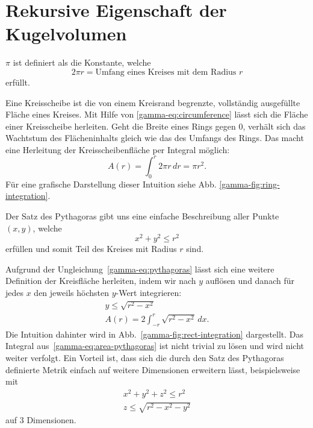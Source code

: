 \section{Rekursive Eigenschaft der Kugelvolumen\label{gamma:section:spheres}}

$\pi$ ist definiert als die Konstante, welche
%
\begin{equation}
\label{gamma-eq:circumference}
    2 \pi r = \text{Umfang eines Kreises mit dem Radius $r$}
\end{equation}
erfüllt.

Eine Kreisscheibe ist die von einem Kreisrand begrenzte, vollständig ausgefüllte Fläche eines Kreises.
%
Mit Hilfe von \eqref{gamma-eq:circumference} lässt sich die Fläche einer Kreisscheibe herleiten. 
Geht die Breite eines Rings gegen 0, verhält sich das 
Wachtstum des Flächeninhalts gleich wie das des Umfangs des Rings.
Das macht eine Herleitung der Kreisscheibenfläche per Integral möglich:
\begin{equation}
\label{gamma-eq:area}
    A(r) = \int_{0}^{r} 2 \pi r \,dr = \pi r^2
.
\end{equation}
Für eine grafische Darstellung dieser
Intuition siehe Abb. \ref{gamma-fig:ring-integration}.

Der Satz des Pythagoras gibt uns eine einfache Beschreibung aller
%
Punkte $(x, y)$, welche
\begin{equation}
\label{gamma-eq:pythagoras}
    x^2 + y^2 \leq r^2
\end{equation}
erfüllen und somit Teil des Kreises mit Radius $r$ sind.

Aufgrund der Ungleichung~\eqref{gamma-eq:pythagoras}
lässt sich eine weitere Definition der Kreisfläche herleiten, 
indem wir nach $y$ auflösen und danach für jedes $x$ den jeweils höchsten $y$-Wert integrieren:
\begin{gather}
\label{gamma-eq:pythagoras-y}
    y \leq \!\sqrt{r^2 - x^2} \\
\label{gamma-eq:area-pythagoras}
    A(r) = 2 \int_{-r}^{r} \!\sqrt{r^2-x^2} \,dx.
\end{gather}
Die Intuition dahinter wird in Abb.~\ref{gamma-fig:rect-integration} dargestellt.
Das Integral aus~\eqref{gamma-eq:area-pythagoras} ist nicht trivial zu lösen
und wird nicht weiter verfolgt.
Ein Vorteil ist, dass sich die durch den Satz des Pythagoras definierte Metrik
einfach auf weitere Dimensionen erweitern lässt, beispielsweise mit
\begin{equation}
\label{gamma-eq:pythagoras-3d}
    \begin{split}
    x^2 + y^2 + z^2 \leq r^2 \\
    z \leq \!\sqrt{r^2 - x^2 - y^2}
    \end{split}
\end{equation}
auf 3 Dimensionen.

